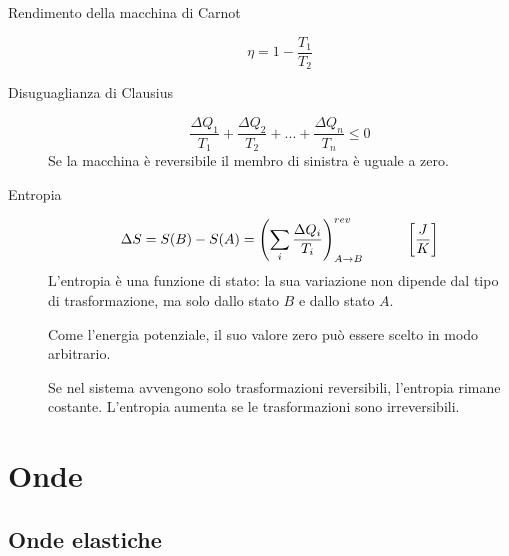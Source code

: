 \documentclass[a4paper,11pt,italian]{article}
\begin{document}
\begin{description}
  \item[Rendimento della macchina di Carnot] 
  \[ \eta = 1 - \frac{T_1}{T_2} \]

  \item[Disuguaglianza di Clausius] 
  \[ \frac{\Delta Q_1}{T_1} + \frac{\Delta Q_2}{T_2} + ... + \frac{\Delta Q_n}{T_n} \leq 0  \]
  Se la macchina è reversibile il membro di sinistra è uguale a zero.

  \item[Entropia]
  \[ \Delta S = S(B) - S(A) = \left( \sum_i \frac{\Delta Q_i}{T_i} \right)^{rev}_{A \rightarrow B} \hspace*{3em} \left[ \frac{J}{K} \right]\]
  L'entropia è una funzione di stato: la sua variazione non dipende dal tipo di trasformazione, ma solo dallo stato $ B $ e dallo stato $ A $.
  
  Come l'energia potenziale, il suo valore zero può essere scelto in modo arbitrario.
  
  Se nel sistema avvengono solo trasformazioni reversibili, l'entropia rimane costante. L'entropia aumenta se le trasformazioni sono irreversibili.

\end{description}



\newpage
\section{Onde}

\subsection{Onde elastiche}
\end{document}
